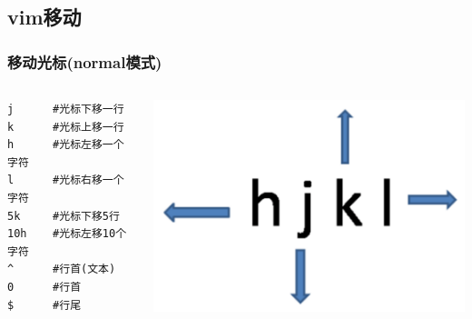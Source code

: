 \documentclass[xcolor=svgnames,presentation]{beamer}
\begin{document}
\subsection{vim移动}
\label{sec-4-2}
\begin{frame}[fragile]
\frametitle{移动光标(normal模式)}
\label{sec-4-2-1}
\begin{columns}
\begin{column}{0.5\textwidth}
\label{sec-4-2-1-1}


\begin{verbatim}
j      #光标下移一行
k      #光标上移一行
h      #光标左移一个字符
l      #光标右移一个字符
5k     #光标下移5行
10h    #光标左移10个字符
^      #行首(文本)
0      #行首
$      #行尾
\end{verbatim}
\end{column}
\begin{column}{0.5\textwidth}
\label{sec-4-2-1-2}

\includegraphics[width=.9\linewidth]{img/vi-move.png}
\end{column}
\end{columns}
\end{frame}
\end{document}
